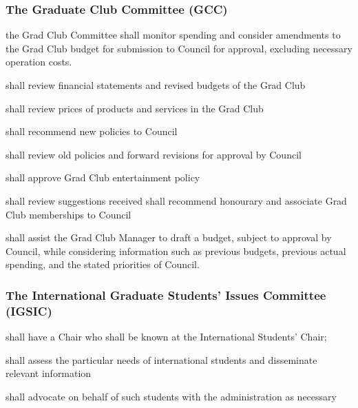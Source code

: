 \subsubsection{The Graduate Club Committee (GCC)}
\begin{longenum}[ label*=\thesubsubsection.\arabic*., align=left]
	\item the Grad Club Committee shall monitor spending and consider amendments to the Grad Club budget for submission to Council for approval, excluding necessary operation costs.
    \item shall review financial statements and revised budgets of the Grad Club
    \item shall review prices of products and services in the Grad Club
    \item shall recommend new policies to Council
    \item shall review old policies and forward revisions for approval by Council
    \item shall approve Grad Club entertainment policy
    \item shall review suggestions received shall recommend honourary and associate Grad Club memberships to Council
    \item shall assist the Grad Club Manager to draft a budget, subject to approval by Council, while considering information such as previous budgets, previous actual spending, and the stated priorities of Council.
\end{longenum}

\subsubsection{The International Graduate Students' Issues Committee (IGSIC)}
\begin{longenum}[ label*=\thesubsubsection.\arabic*., align=left]
	\item shall have a Chair who shall be known at the International Students' Chair;
    \item shall assess  the particular needs of international students and disseminate relevant information
    \item shall advocate on behalf of such students with the administration as necessary
\end{longenum}

